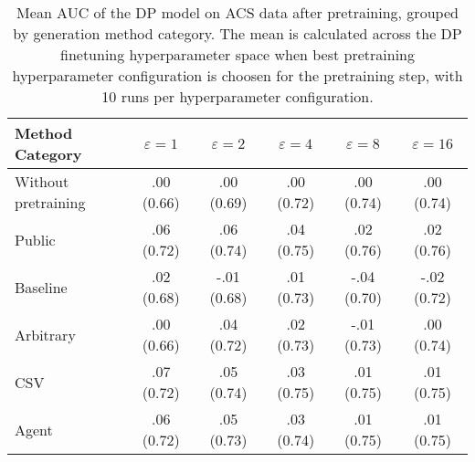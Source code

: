 \begin{table}[h!]
    \centering
    \caption{Mean AUC of the DP model on ACS data after pretraining, grouped by generation method category. The mean is calculated across the DP finetuning hyperparameter space when best pretraining hyperparameter configuration is choosen for the pretraining step, with 10 runs per hyperparameter configuration.}
    \label{tab:epsilon_comparison}
    \begin{tabular}{lccccc}
    \toprule
    Method Category & $\varepsilon=1$ & $\varepsilon=2$ & $\varepsilon=4$ & $\varepsilon=8$ & $\varepsilon=16$ \\
    \midrule
    Without pretraining & .00 {\small (0.66)} & .00 {\small (0.69)} & .00 {\small (0.72)} & .00 {\small (0.74)} & .00 {\small (0.74)} \\
    \arrayrulecolor{black!50!}\midrule
    Public & \cellcolor{silver!30}.06 {\small (0.72)} & \cellcolor{gold!30}.06 {\small (0.74)} & \cellcolor{gold!30}.04 {\small (0.75)} & \cellcolor{gold!30}.02 {\small (0.76)} & \cellcolor{gold!30}.02 {\small (0.76)} \\
    \arrayrulecolor{black!50!}\midrule
    Baseline & .02 {\small (0.68)} & -.01 {\small (0.68)} & .01 {\small (0.73)} & -.04 {\small (0.70)} & -.02 {\small (0.72)} \\
    \arrayrulecolor{black!50!}\midrule
    Arbitrary & .00 {\small (0.66)} & .04 {\small (0.72)} & .02 {\small (0.73)} & -.01 {\small (0.73)} & .00 {\small (0.74)} \\
    \arrayrulecolor{black!50!}\midrule
    CSV & \cellcolor{gold!30}.07 {\small (0.72)} & \cellcolor{silver!30}.05 {\small (0.74)} & \cellcolor{silver!30}.03 {\small (0.75)} & \cellcolor{silver!30}.01 {\small (0.75)} & \cellcolor{silver!30}.01 {\small (0.75)} \\
    Agent & \cellcolor{bronze!30}.06 {\small (0.72)} & \cellcolor{bronze!30}.05 {\small (0.73)} & \cellcolor{bronze!30}.03 {\small (0.74)} & \cellcolor{bronze!30}.01 {\small (0.75)} & \cellcolor{bronze!30}.01 {\small (0.75)} \\
    \bottomrule
    \end{tabular}
\end{table}